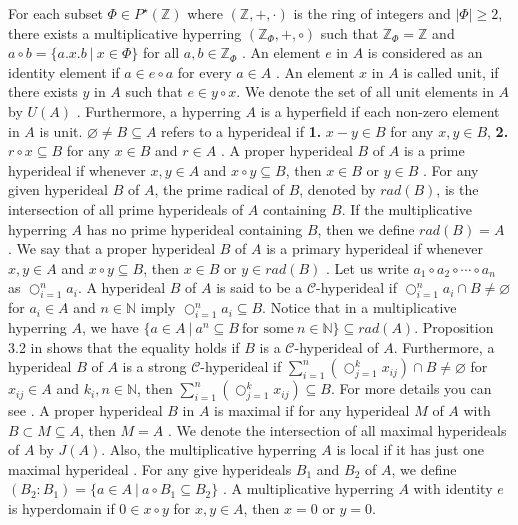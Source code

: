\documentclass[preprint,review,10pt]{amsart}
\theoremstyle{definition}
\theoremstyle{remark}
\numberwithin{equation}{section}
\begin{document}
 
 For each subset $\Phi \in P^\star(\mathbb{Z})$   where $(\mathbb{Z},+,\cdot)$ is the ring of integers  and $\vert \Phi \vert \geq 2$, there exists a multiplicative hyperring $(\mathbb{Z}_\Phi,+,\circ)$ such that  $\mathbb{Z}_{\Phi}=\mathbb{Z}$ and  $a \circ b =\{a.x.b\ \vert \ x \in \Phi\}$ for all $a,b\in \mathbb{Z}_\Phi$ \cite{das}.
An element $e$ in $ A$ is considered as an identity element if $a \in e\circ a$ for every  $a \in A$ \cite{ameri}. An element $x$ in $ A$ is called unit, if there exists $y $ in $ A$ such that $e \in y \circ x$.  We denote the set of all unit elements in $A$ by $U(A)$  \cite{ameri}. Furthermore, a hyperring $A$ is a hyperfield if each non-zero element in $A$ is unit. $\varnothing \neq  B \subseteq A$ refers to  a  hyperideal  if {\bf 1.}  $x - y \in B$ for any $x, y \in B$,  {\bf 2.} $r \circ x \subseteq B$ for any $x \in B$ and $r \in A$ \cite{f10}.
 A proper hyperideal $B$ of   $A$ is a prime hyperideal if whenever $x,y \in A$ and $x \circ y \subseteq B$, then $x \in B$ or $y \in B$ \cite{das}.
  For any given hyperideal $B$ of $A$, the prime radical of $B$,  denoted by $rad (B)$, is the intersection of all prime hyperideals of $A$ containing  $B$. If the multiplicative hyperring $A$  has no prime hyperideal containing $B$, then we  define $rad(B)=A$ \cite{das}. We say that a proper hyperideal $B$ of   $A$ is a primary hyperideal if whenever $x,y \in A$ and $x \circ y \subseteq B$, then $x \in B$ or $y \in rad(B)$ \cite{das}. Let us write $a_1 \circ a_2 \circ \cdots \circ a_n$ as $\bigcirc_{i=1}^n a_i$. A hyperideal $B$ of $A$ is said to be a $\mathcal{C}$-hyperideal  if $\bigcirc_{i=1}^n a_i \cap B \neq \varnothing $ for $a_i \in A$ and $n \in \mathbb{N}$ imply $\bigcirc_{i=1}^n a_i \subseteq B$. Notice that in a multiplicative hyperring $A$, we have
 $\{a \in A \ \vert \  a^n \subseteq B \ \text{for some} \ n \in \mathbb{N}\} \subseteq rad(A)$. Proposition 3.2 in \cite{das} shows that the equality holds if $B$ is a $\mathcal{C}$-hyperideal of $A$. Furthermore, a hyperideal $B$ of $A$ is  a strong $\mathcal{C}$-hyperideal if $\sum_{i=1}^n(\bigcirc_{j=1}^k x_{ij}) \cap B \neq \varnothing$ for $x_{ij} \in A$ and  $k_i, n \in  \mathbb{N}$, then  $\sum_{i=1}^n(\bigcirc_{j=1}^k x_{ij}) \subseteq  B$. For more details you can see \cite{phd}. 
  A proper hyperideal $B$ in $A$ is maximal  if for
any hyperideal $M$ of $A$ with $B \subset M \subseteq A$, then $M = A$ \cite{ameri}. We denote the intersection of all maximal hyperideals of $A$  by $J(A)$. Also, the multiplicative hyperring $A$ is local  if it has just one maximal hyperideal \cite{ameri}.   For any give hyperideals  $B_1$ and $B_2$   of $A$, we define $(B_2:B_1)=\{a \in A \ \vert \ a \circ B_1 \subseteq B_2\}$ \cite{ameri}. A multiplicative hyperring  $A$ with identity $e$ is  hyperdomain if $0 \in x \circ y$ for  $x,y \in A$, then $x=0$ or $y=0$.
\end{document}
